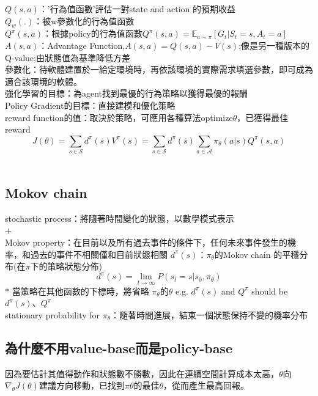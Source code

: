 \documentclass[14pt,a4paper]{report}  %
\begin{document}
$Q(s, a)$：'行為值函數'評估一對state and action 的預期收益\\
$Q_w(.)$：被w參數化的行為值函數\\
$Q^\pi(s, a)$：根據policy的行為值函數$Q^\pi(s, a) = \mathbb{E}_{a\sim \pi} [G_t \vert S_t = s, A_t = a]$\\
$A(s, a)$：Advantage Function,$A(s, a) = Q(s, a) - V(s)$;像是另一種版本的Q-value;由狀態值為基準降低方差\\
參數化：待軟體建置於一給定環境時，再依該環境的實際需求填選參數，即可成為適合該環境的軟體。\\
強化學習的目標：為agent找到最優的行為策略以獲得最優的報酬\\
Policy Gradient的目標：直接建模和優化策略\\
reward function的值：取決於策略，可應用各種算法optimize$\theta$，已獲得最佳reward\\[5pt]
$$J(\theta) 
= \sum_{s \in \mathcal{S}} d^\pi(s) V^\pi(s) 
= \sum_{s \in \mathcal{S}} d^\pi(s) \sum_{a \in \mathcal{A}} \pi_\theta(a \vert s) Q^\pi(s, a)$$\\
\subsection{Mokov chain}
stochastic process：將隨著時間變化的狀態，以數學模式表示\\[5pt]
$+$\\[5pt]
Mokov property：在目前以及所有過去事件的條件下，任何未來事件發生的機率，和過去的事件不相關僅和目前狀態相關
$d^\pi(s)$：$\pi_\theta$的Mokov chain 的平穩分布(在$\pi$下的策略狀態分佈) $$d^\pi(s) = \lim_{t \to \infty} P(s_t = s \vert s_0, \pi_\theta)$$
$\ast$ 當策略在其他函數的下標時，將省略 $\pi_\theta$的$\theta$  e.g. $d^\pi(s)$ and $Q^\pi$ should be 
$d^\pi(s)$、$Q^\pi$\\[5pt]
stationary probability for $\pi_\theta$：隨著時間進展，結束一個狀態保持不變的機率分布\\
\subsection{為什麼不用value-base而是policy-base}
因為要估計其值得動作和狀態數不勝數，因此在連續空間計算成本太高，$\theta$向$\nabla_\theta J(\theta)$建議方向移動，已找到$\pi\theta$的最佳$\theta$，從而產生最高回報。
\end{document}
